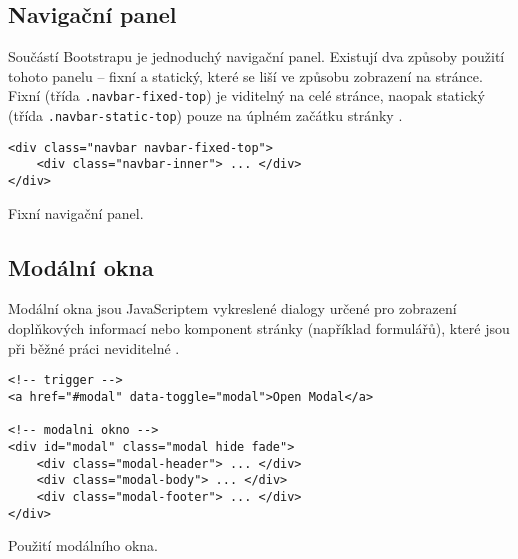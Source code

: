 \subsection{Navigační panel}

Součástí Bootstrapu je jednoduchý navigační panel. Existují dva způsoby použití tohoto panelu -- fixní a statický, které se liší ve způsobu zobrazení na stránce. Fixní (třída \texttt{.navbar-fixed-top}) je viditelný na celé stránce, naopak statický (třída \texttt{.navbar-static-top}) pouze na úplném začátku stránky \cite{19}.

\begin{example}
    \centering
    \begin{lstlisting}
<div class="navbar navbar-fixed-top">
    <div class="navbar-inner"> ... </div>
</div>
    \end{lstlisting}
    \caption{Fixní navigační panel.}
    \label{example:navbar}
\end{example}

\subsection{Modální okna}

Modální okna jsou JavaScriptem vykreslené dialogy určené pro zobrazení doplňkových informací nebo komponent stránky (například formulářů), které jsou při běžné práci neviditelné \cite{19}.

\begin{example}
    \centering
    \begin{lstlisting}[language=html5]
<!-- trigger -->
<a href="#modal" data-toggle="modal">Open Modal</a>

<!-- modalni okno -->
<div id="modal" class="modal hide fade">
    <div class="modal-header"> ... </div>
    <div class="modal-body"> ... </div>
    <div class="modal-footer"> ... </div>
</div>
    \end{lstlisting}
    \caption{Použití modálního okna.}
    \label{example:modal}
\end{example}
